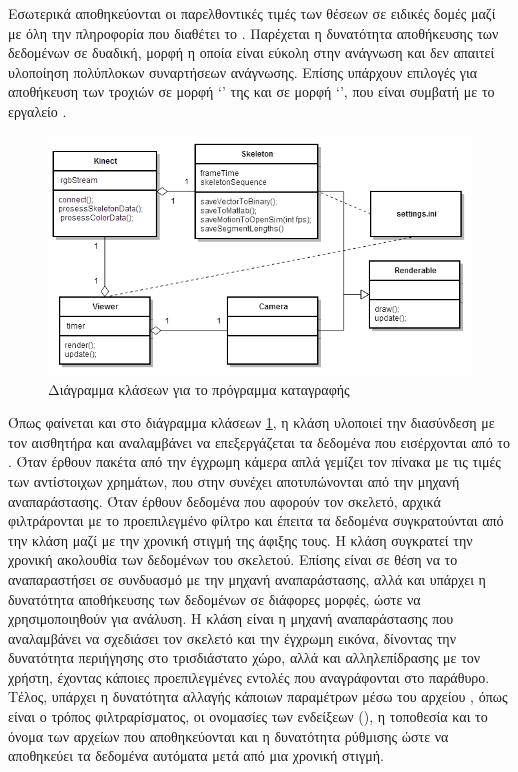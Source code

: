 Εσωτερικά αποθηκεύονται οι παρελθοντικές τιμές των θέσεων σε ειδικές δομές μαζί με όλη την πληροφορία που διαθέτει το . Παρέχεται η δυνατότητα αποθήκευσης των δεδομένων σε δυαδική, μορφή η οποία είναι εύκολη στην ανάγνωση και δεν απαιτεί υλοποίηση πολύπλοκων συναρτήσεων ανάγνωσης. Επίσης υπάρχουν επιλογές για αποθήκευση των τροχιών σε μορφή \lq {}\rq\; της  και σε μορφή \lq {}\rq  , που είναι συμβατή με το εργαλείο .

\begin{figure}[H]
    \centering
    \includegraphics[width=.9\textwidth, keepaspectratio]{fig/motion-capture-class-diagram.png}
    \caption{Διάγραμμα κλάσεων για το πρόγραμμα καταγραφής}
    \label{fig:motion-capture-class-diagram}
\end{figure}

Όπως φαίνεται και στο διάγραμμα κλάσεων \ref{fig:motion-capture-class-diagram}, η κλάση  υλοποιεί την διασύνδεση με τον αισθητήρα και αναλαμβάνει να επεξεργάζεται τα δεδομένα που εισέρχονται από το . Όταν έρθουν πακέτα από την έγχρωμη κάμερα απλά γεμίζει τον πίνακα  με τις τιμές των αντίστοιχων χρημάτων, που στην συνέχει αποτυπώνονται από την μηχανή αναπαράστασης. Όταν έρθουν δεδομένα που αφορούν τον σκελετό, αρχικά φιλτράρονται με το προεπιλεγμένο φίλτρο και έπειτα τα δεδομένα συγκρατούνται από την κλάση  μαζί με την χρονική στιγμή της άφιξης τους. Η κλάση  συγκρατεί την χρονική ακολουθία των δεδομένων του σκελετού. Επίσης είναι σε θέση να το αναπαραστήσει σε συνδυασμό με την μηχανή αναπαράστασης, αλλά και υπάρχει η δυνατότητα αποθήκευσης των δεδομένων σε διάφορες μορφές, ώστε να χρησιμοποιηθούν για ανάλυση. Η κλάση  είναι η μηχανή αναπαράστασης που αναλαμβάνει να σχεδιάσει τον σκελετό και την έγχρωμη εικόνα, δίνοντας την δυνατότητα περιήγησης στο τρισδιάστατο χώρο, αλλά και αλληλεπίδρασης με τον χρήστη, έχοντας κάποιες προεπιλεγμένες εντολές που αναγράφονται στο παράθυρο. Τέλος, υπάρχει η δυνατότητα αλλαγής κάποιων παραμέτρων μέσω του αρχείου , όπως είναι ο τρόπος φιλτραρίσματος, οι ονομασίες των ενδείξεων (), η τοποθεσία και το όνομα των αρχείων που αποθηκεύονται και η δυνατότητα ρύθμισης  ώστε να αποθηκεύει τα δεδομένα αυτόματα μετά από μια χρονική στιγμή.

